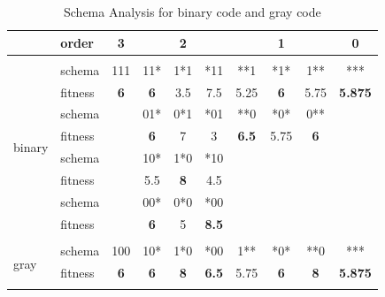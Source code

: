 \documentclass[12pt, a4paper]{article}
\begin{document}
        \begin{table}[H]
        \centering
        \caption{Schema Analysis for binary code and gray code}
        \label{tab:sa}
            \begin{tabular}{|l|l|c|ccc|ccc|c|}
            \hline
                                    & order   & 3          & \multicolumn{3}{c|}{2}                 & \multicolumn{3}{c|}{1}                 & 0              \\ \hline
            \multicolumn{10}{|c|}{} \\ \hline
            \multirow{8}{*}{binary} & schema  & 111        & 11*        & 1*1        & *11          & **1          & *1*        & 1**        & ***            \\
                                    & fitness & \textbf{6} & \textbf{6} & 3.5        & 7.5          & 5.25         & \textbf{6} & 5.75       & \textbf{5.875} \\ \cline{2-10}
                                    & schema  &            & 01*        & 0*1        & *01          & **0          & *0*        & 0**        &                \\
                                    & fitness &            & \textbf{6} & 7          & 3            & \textbf{6.5} & 5.75       & \textbf{6} &                \\ \cline{2-10}
                                    & schema  &            & 10*        & 1*0        & *10          &              &            &            &                \\
                                    & fitness &            & 5.5        & \textbf{8} & 4.5          &              &            &            &                \\ \cline{2-10}
                                    & schema  &            & 00*        & 0*0        & *00          &              &            &            &                \\
                                    & fitness &            & \textbf{6} & 5          & \textbf{8.5} &              &            &            &                \\ \hline
            \multicolumn{10}{|c|}{} \\ \hline
            \multirow{8}{*}{gray}   & schema  & 100        & 10*        & 1*0        & *00          & 1**          & *0*        & **0        & ***            \\
                                    & fitness & \textbf{6} & \textbf{6} & \textbf{8} & \textbf{6.5} & 5.75         & \textbf{6} & \textbf{8} & \textbf{5.875} \\ \cline{2-10}

\end{tabular}
\end{table}
\end{document}
